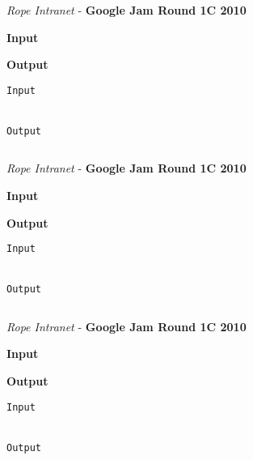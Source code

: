 \begin{problem}{\textit{Rope Intranet} - \textbf{Google Jam Round 1C 2010}}




\textbf{Input}


\textbf{Output}


\begin{framed}
	\begin{verbatim}
Input 


Output 

	\end{verbatim}
\end{framed}

\end{problem}

\begin{solution}
	
	\begin{lstlisting}[language=c++, caption="Store credit c++ solution"]


	\end{lstlisting}
\end{solution}



\begin{problem}{\textit{Rope Intranet} - \textbf{Google Jam Round 1C 2010}}




\textbf{Input}


\textbf{Output}


\begin{framed}
	\begin{verbatim}
Input 


Output 

	\end{verbatim}
\end{framed}

\end{problem}

\begin{solution}
	
	\begin{lstlisting}[language=c++, caption="Store credit c++ solution"]


	\end{lstlisting}
\end{solution}



\begin{problem}{\textit{Rope Intranet} - \textbf{Google Jam Round 1C 2010}}




\textbf{Input}


\textbf{Output}


\begin{framed}
	\begin{verbatim}
Input 


Output 

	\end{verbatim}
\end{framed}

\end{problem}


